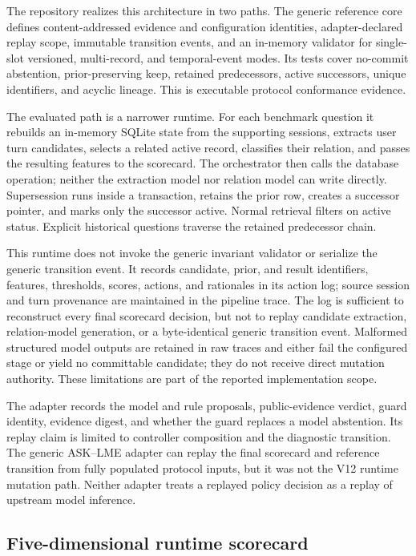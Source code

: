 The repository realizes this architecture in two paths. The generic reference
core defines content-addressed evidence and configuration identities,
adapter-declared replay scope, immutable transition events, and an in-memory
validator for single-slot versioned, multi-record, and temporal-event modes.
Its tests cover no-commit abstention, prior-preserving keep, retained
predecessors, active successors, unique identifiers, and acyclic lineage. This
is executable protocol conformance evidence.

The evaluated \lme{} path is a narrower runtime. For each benchmark question it
rebuilds an in-memory SQLite state from the supporting sessions, extracts user
turn candidates, selects a related active record, classifies their relation,
and passes the resulting features to the scorecard. The orchestrator then calls
the database operation; neither the extraction model nor relation model can
write directly. Supersession runs inside a transaction, retains the prior row,
creates a successor pointer, and marks only the successor active. Normal
retrieval filters on active status. Explicit historical questions traverse the
retained predecessor chain.

This runtime does not invoke the generic invariant validator or serialize the
generic transition event. It records candidate, prior, and result identifiers,
features, thresholds, scores, actions, and rationales in its action log; source
session and turn provenance are maintained in the pipeline trace. The log is
sufficient to reconstruct every final scorecard decision, but not to replay
candidate extraction, relation-model generation, or a byte-identical generic
transition event. Malformed structured model outputs are retained in raw traces
and either fail the configured stage or yield no committable candidate; they do
not receive direct mutation authority. These limitations are part of the
reported implementation scope.

The \mgpc{} adapter records the model and rule proposals, public-evidence
verdict, guard identity, evidence digest, and whether the guard replaces a model
abstention. Its replay claim is limited to controller composition and the
diagnostic transition. The generic ASK--LME adapter can replay the final
scorecard and reference transition from fully populated protocol inputs, but it
was not the V12 runtime mutation path. Neither adapter treats a replayed policy
decision as a replay of upstream model inference.

\subsection{Five-dimensional runtime scorecard}
\label{sec:scorecard}

